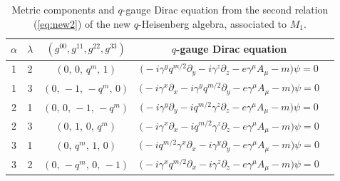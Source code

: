 \documentclass[12pt,a4paper]{article}
\theoremstyle{plain}
\theoremstyle{definition}
\begin{document}
\begin{table}[H]
\centering\small
\caption{Metric components and $q$-gauge Dirac equation from the second relation (\ref{eq:new2}) of the new $q$-Heisenberg algebra, associated to $M_1$.}
\label{tab:new2-dirac-m1}
\begin{tabular}{@{}cccccc@{}}
\toprule
$\alpha$ & $\lambda$ & $(g^{00},g^{11},g^{22},g^{33})$ & \multicolumn{2}{c}{$q$-gauge Dirac equation} \\
\midrule
1 & 2 & $(0,\,0,\,q^{m},\,1)$ & \multicolumn{2}{c}{$\bigl( -i\gamma^{y} q^{m/2}\partial_y - i\gamma^{z}\partial_z - e\gamma^{\mu}A_{\mu} - m \bigr)\psi = 0$} \\
1 & 3 & $(0,\,-1,\,-q^{m},\,0)$ & \multicolumn{2}{c}{$\bigl( -i\gamma^{x}\partial_x - i\gamma^{y} q^{m/2}\partial_y - e\gamma^{\mu}A_{\mu} - m \bigr)\psi = 0$} \\
2 & 1 & $(0,\,0,\,-1,\,-q^{m})$ & \multicolumn{2}{c}{$\bigl( -i\gamma^{y}\partial_y - i q^{m/2}\gamma^{z}\partial_z - e\gamma^{\mu}A_{\mu} - m \bigr)\psi = 0$} \\
2 & 3 & $(0,\,1,\,0,\,q^{m})$ & \multicolumn{2}{c}{$\bigl( -i\gamma^{x}\partial_x - i q^{m/2}\gamma^{z}\partial_z - e\gamma^{\mu}A_{\mu} - m \bigr)\psi = 0$} \\
3 & 1 & $(0,\,q^{m},\,1,\,0)$ & \multicolumn{2}{c}{$\bigl( -i q^{m/2}\gamma^{x}\partial_x - i\gamma^{y}\partial_y - e\gamma^{\mu}A_{\mu} - m \bigr)\psi = 0$} \\
3 & 2 & $(0,\,-q^{m},\,0,\,-1)$ & \multicolumn{2}{c}{$\bigl( -i\gamma^{x} q^{m/2}\partial_x - i\gamma^{z}\partial_z - e\gamma^{\mu}A_{\mu} - m \bigr)\psi = 0$} \\
\bottomrule
\end{tabular}
\end{table}
\end{document}
